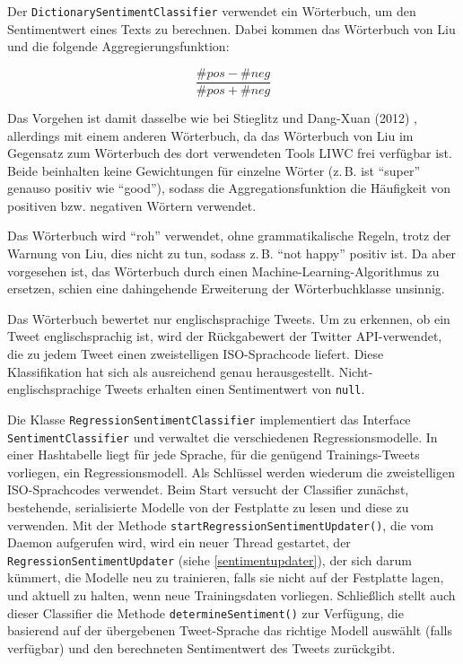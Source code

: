 Der \texttt{Dictionary\-Sentiment\-Classifier} verwendet ein Wörterbuch, um den Sentimentwert eines Texts zu berechnen. Dabei kommen das ​Wörterbuch von Liu \cite{LiuLexicon}
 und die folgende Aggregierungsfunktion:

\[ \frac{\#pos - \#neg}{\#pos + \#neg} \]

Das Vorgehen ist damit dasselbe wie bei ​Stieglitz und Dang-Xuan (2012) \cite{Stieglitz2012}, allerdings mit einem anderen Wörterbuch, da das Wörterbuch von Liu im Gegensatz zum Wörterbuch des dort verwendeten Tools LIWC frei verfügbar ist. Beide beinhalten keine Gewichtungen für einzelne Wörter (z.\,B. ist "`super"' genauso positiv wie "`good"'), sodass die Aggregationsfunktion die Häufigkeit von positiven bzw. negativen Wörtern verwendet.

Das Wörterbuch wird "`roh"' verwendet, ohne grammatikalische Regeln, trotz der Warnung von Liu, dies nicht zu tun, sodass z.\,B. "`not happy"' positiv ist. Da aber vorgesehen ist, das Wörterbuch durch einen Machine-Learning-Algorithmus zu ersetzen, schien eine dahingehende Erweiterung der Wörterbuchklasse unsinnig.

Das Wörterbuch bewertet nur englischsprachige Tweets. Um zu erkennen, ob ein Tweet englischsprachig ist, wird der Rückgabewert der Twitter API-verwendet, die zu jedem Tweet einen zweistelligen ISO-Sprachcode liefert. Diese Klassifikation hat sich als ausreichend genau herausgestellt. Nicht-englischsprachige Tweets erhalten einen Sentimentwert von \texttt{null}. 

Die Klasse \texttt{Regression\-Sentiment\-Classifier} implementiert das Interface \texttt{Sentiment\-Classifier} und verwaltet die verschiedenen Regressionsmodelle. In einer Hashtabelle liegt für jede Sprache, für die genügend Trainings-Tweets vorliegen, ein Regressionsmodell. Als Schlüssel werden wiederum die zweistelligen ISO-Sprachcodes verwendet. Beim Start versucht der Classifier zunächst, bestehende, serialisierte Modelle von der Festplatte zu lesen und diese zu verwenden. Mit der Methode \texttt{start\-Regression\-Sentiment\-Updater()}, die vom Daemon aufgerufen wird, wird ein neuer Thread gestartet, der \texttt{Regression\-Sentiment\-Updater} (siehe \ref{sentimentupdater}), der sich darum kümmert, die Modelle neu zu trainieren, falls sie nicht auf der Festplatte lagen, und aktuell zu halten, wenn neue Trainingsdaten vorliegen. Schließlich stellt auch dieser Classifier die Methode \texttt{determine\-Sentiment()} zur Verfügung, die basierend auf der übergebenen Tweet-Sprache das richtige Modell auswählt (falls verfügbar) und den berechneten Sentimentwert des Tweets zurückgibt.

